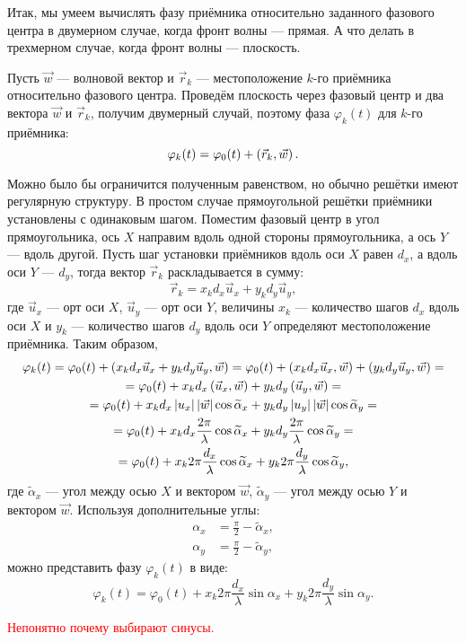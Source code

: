 Итак, мы умеем вычислять фазу приёмника относительно заданного фазового центра в двумерном случае, когда фронт волны --- прямая. А что делать в трехмерном случае, когда фронт
волны --- плоскость.

Пусть $\vec{w}$ --- волновой вектор и $\vec{r}_k$ --- местоположение $k$-го приёмника относительно фазового центра. Проведём плоскость через фазовый центр и два вектора $\vec{w}$
и $\vec{r}_k$, получим двумерный случай, поэтому фаза $\varphi_k(t)$ для $k$-го приёмника:
\[
    \varphi_k(t) = \varphi_0(t) + \left ( \vec{r}_k, \vec{w} \right ) .
\]

Можно было бы ограничится полученным равенством, но обычно решётки имеют регулярную структуру. В простом случае прямоугольной решётки приёмники установлены с одинаковым шагом.
Поместим фазовый центр в угол прямоугольника, ось $X$ направим вдоль одной стороны прямоугольника, а ось $Y$ --- вдоль другой. Пусть шаг установки приёмников вдоль оси $X$
равен $d_x$, а вдоль оси $Y$ --- $d_y$, тогда вектор $\vec{r}_k$ раскладывается в сумму:
\[
    \vec{r}_k = x_k d_x \vec{u}_x + y_k d_y \vec{u}_y,
\]
где $\vec{u}_x$ --- орт оси $X$, $\vec{u}_y$ --- орт оси $Y$, величины $x_k$ --- количество шагов $d_x$ вдоль оси $X$ и $y_k$ --- количество шагов $d_y$ вдоль оси $Y$
определяют местоположение приёмника. Таким образом,
\begin{multline*}
    \varphi_k(t)
    = \varphi_0(t) + \left ( x_k d_x \vec{u}_x + y_k d_y \vec{u}_y, \vec{w} \right )
    = \varphi_0(t) + \left ( x_k d_x \vec{u}_x, \vec{w} \right ) + \left ( y_k d_y \vec{u}_y, \vec{w} \right ) = \\
    = \varphi_0(t) + x_k d_x \left ( \vec{u}_x, \vec{w} \right ) + y_k d_y \left ( \vec{u}_y, \vec{w} \right ) = \\
    = \varphi_0(t) + x_k d_x \left | u_x \right | \left | \vec{w} \right | \cos \widetilde{\alpha}_x + y_k d_y \left | u_y \right | \left | \vec{w} \right | \cos \widetilde{\alpha}_y = \\
    = \varphi_0(t) + x_k d_x \frac{2 \pi}{\lambda} \cos \widetilde{\alpha}_x + y_k d_y \frac{2 \pi}{\lambda} \cos \widetilde{\alpha}_y = \\
    = \varphi_0(t) + x_k 2 \pi \frac{d_x}{\lambda} \cos \widetilde{\alpha}_x + y_k 2 \pi \frac{d_y}{\lambda} \cos \widetilde{\alpha}_y,
\end{multline*}
где $\widetilde{\alpha}_x$ --- угол между осью $X$ и вектором $\vec{w}$, $\widetilde{\alpha}_y$ --- угол между осью $Y$ и вектором $\vec{w}$. Используя дополнительные углы:
\begin{align*}
    \alpha_x & = \frac{\pi}{2} - \widetilde{\alpha}_x, \\
    \alpha_y & = \frac{\pi}{2} - \widetilde{\alpha}_y,
\end{align*}
можно представить фазу $\varphi_k(t)$ в виде:
\[
    \varphi_k(t)
    = \varphi_0(t) + x_k 2 \pi \frac{d_x}{\lambda} \sin \alpha_x + y_k 2 \pi \frac{d_y}{\lambda} \sin \alpha_y .
\]

\textcolor{red}{Непонятно почему выбирают синусы.}